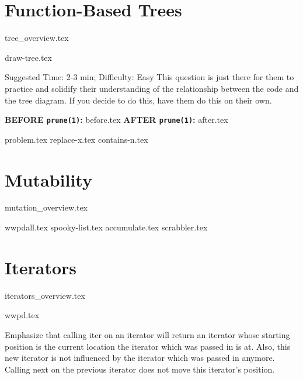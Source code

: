 \documentclass{exam}
\begin{document}
\section{Function-Based Trees}
{tree_overview.tex}
\begin{questions}
    {draw-tree.tex}
    \begin{questionmeta}
        Suggested Time: 2-3 min; Difficulty: Easy
        This question is just there for them to practice and solidify their understanding of the relationship between the code and the tree diagram. 
        If you decide to do this, have them do this on their own.
    \end{questionmeta}
    \newpage
    \begin{blocksection} 
        \textbf{BEFORE \lstinline{prune(1)}:}
        {before.tex}
        \hspace{0.5in}
        \textbf{AFTER \lstinline{prune(1)}:}
        {after.tex}
    \end{blocksection}
    {problem.tex}
    {replace-x.tex} 
    {contains-n.tex}
\end{questions}

\newpage
    
\section{Mutability}
{mutation_overview.tex}
\begin{questions}
    {wwpdall.tex}
    {spooky-list.tex}
    {accumulate.tex}
    \newpage
    {scrabbler.tex}
\end{questions}

\section{Iterators}
{iterators_overview.tex}
\begin{questions}
    {wwpd.tex}
    \begin{questionmeta}
        Emphasize that calling iter on an iterator will return an iterator whose starting position is the current location the iterator which was passed in is at. Also, this new iterator is not influenced by the iterator which was passed in anymore. Calling next on the previous iterator does not move this iterator's position.
    \end{questionmeta}
\end{questions}
\end{document}

